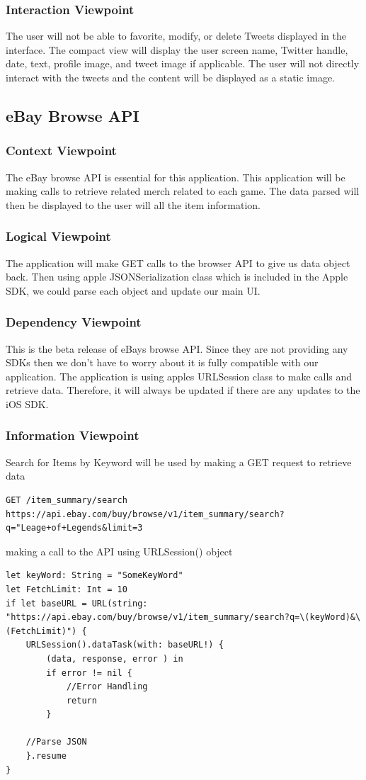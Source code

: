\documentclass[onecolumn, draftclsnofoot,10pt, compsoc]{IEEEtran}
\begin{document}
\subsubsection{Interaction Viewpoint}
The user will not be able to favorite, modify, or delete Tweets displayed in the interface.
The compact view will display the user screen name, Twitter handle, date, text, profile image, and tweet image if applicable. The user will not directly interact with the tweets and the content will be displayed as a static image. 

\subsection{eBay Browse API}
\subsubsection{Context Viewpoint}
The eBay browse API is essential for this application. This application will be making calls to retrieve related merch related to each game. The data parsed will then be displayed to the user will all the item information. 

\subsubsection{Logical Viewpoint}
The application will make GET calls to the browser API to give us data object back. Then using apple JSONSerialization class which is included in the Apple SDK, we could parse each object and update our main UI. 

\subsubsection{Dependency Viewpoint}
This is the beta release of eBays browse API. Since they are not providing any SDKs then we don't have to worry about it is fully compatible with our application. The application is using apples URLSession class to make calls and retrieve data. Therefore, it will always be updated if there are any updates to the iOS SDK. 

\subsubsection{Information Viewpoint}
Search for Items by Keyword will be used by making a GET request to retrieve data

\begin{verbatim}
GET /item_summary/search
https://api.ebay.com/buy/browse/v1/item_summary/search?q="Leage+of+Legends&limit=3
\end{verbatim}
making a call to the API using URLSession() object
\begin{verbatim}
let keyWord: String = "SomeKeyWord"
let FetchLimit: Int = 10
if let baseURL = URL(string: "https://api.ebay.com/buy/browse/v1/item_summary/search?q=\(keyWord)&\(FetchLimit)") {
    URLSession().dataTask(with: baseURL!) {
        (data, response, error ) in
        if error != nil {
            //Error Handling
            return
        }
        
    //Parse JSON
    }.resume
}
\end{verbatim}
\end{document}
